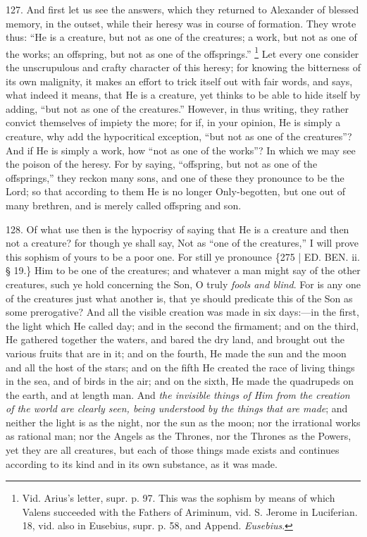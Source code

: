 127. And first let us see the
answers, which they returned to Alexander of blessed memory, in the
outset, while their heresy was in course of formation. They wrote
thus: ``He is a creature, but not as one of the creatures; a work, but
not as one of the works; an offspring, but not as one of the
offsprings.'' \footnote{Vid. Arius's letter, supr. p. 97. This was the sophism by means of
which Valens succeeded with the Fathers of Ariminum, vid. S. Jerome in
Luciferian. 18, vid. also in Eusebius, supr. p. 58, and Append. \emph{Eusebius}.} Let every
one consider the unscrupulous and crafty character of this heresy; for
knowing the bitterness of its own malignity, it makes an effort to
trick itself out with fair words, and says, what indeed it means, that
He is a creature, yet thinks to be able to hide itself by adding, ``but
not as one of the creatures.'' However, in thus writing, they rather
convict themselves of impiety the more; for if, in your opinion, He is
simply a creature, why add the hypocritical exception, ``but not as one
of the creatures''? And if He is simply a work, how ``not as one of the
works''? In which we may see the poison of the heresy. For by saying, ``offspring,
but not as one of the offsprings,'' they reckon many sons, and one of
these they pronounce to be the Lord; so that according to them He is
no longer Only-begotten, but one out of many brethren, and is merely
called offspring and son.

128. Of what use then is the
hypocrisy of saying that He is a creature and then not a creature? for
though ye shall say, Not as ``one of the creatures,'' I will prove this
sophism of yours to be a poor one. For still ye pronounce \{275 | ED. BEN.
ii. § 19.\} Him to be one of the creatures; and whatever a man might
say of the other creatures, such ye hold concerning the Son, O truly \emph{fools
and blind}. For is any one of the creatures just what another is,
that ye should predicate this of the Son as some prerogative? And all
the visible creation was made in six days:—in the first, the light
which He called day; and in the second the firmament; and on the
third, He gathered together the waters, and bared the dry land, and
brought out the various fruits that are in it; and on the fourth, He
made the sun and the moon and all the host of the stars; and on the
fifth He created the race of living things in the sea, and of birds in
the air; and on the sixth, He made the quadrupeds on the earth, and at
length man. And \emph{the invisible things of Him from the creation of
the world are clearly seen, being understood by the things that are
made}; and neither the light is as the night, nor the sun as the
moon; nor the irrational works as rational man; nor the Angels as the
Thrones, nor the Thrones as the Powers, yet they are all creatures,
but each of those things made exists and continues according to its
kind and in its own substance, as it was made.

